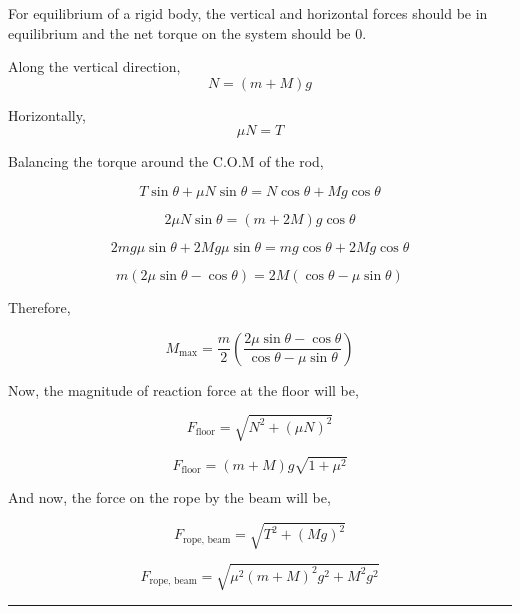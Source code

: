 \documentclass[twocolumn]{article}
\begin{document}
\begin{CJK*}{UTF8}{gbsn}
For equilibrium of a rigid body, the vertical and horizontal forces should be in equilibrium and the net torque on the system should be 0. 

\begin{center}
\end{center}

Along the vertical direction, 
\[
    N = (m + M)g
\]

Horizontally,
\[
    \mu N = T
\]

Balancing the torque around the C.O.M of the rod, 

\[
    T \sin \theta + \mu N \sin \theta = N \cos \theta + Mg \cos \theta
\]

\[
    2 \mu N \sin \theta = (m + 2M)g\cos \theta 
\]

\[
    2 mg \mu \sin \theta + 2Mg \mu \sin \theta = mg \cos \theta + 2Mg \cos \theta 
\]

\[
    m(2\mu \sin \theta - \cos \theta) = 2M (\cos \theta - \mu \sin \theta )
\]

Therefore, 

\[
    \boxed{M_{\text{max} } = \frac{m}{2} (\frac{2\mu \sin \theta - \cos \theta }{\cos \theta - \mu \sin \theta})}
\]

Now, the magnitude of reaction force at the floor will be,

\[
    F_{\text{floor} }  = \sqrt{N^{2} + (\mu N)^{2} }
\]

\[
    \boxed{F_{\text{floor} } = (m + M)g \sqrt{1 + \mu ^{2} }}
\]

And now, the force on the rope by the beam will be,

\[
    F_{\text{rope, beam} } = \sqrt{T^{2} + (Mg)^{2} }  
\]

\[
    \boxed{F_{\text{rope, beam} } = \sqrt{\mu ^{2} (m + M)^{2} g^{2} + M^{2} g^{2} }  }
\]

\vspace{0.1in}
\hrule 


\end{CJK*}
\end{document}
